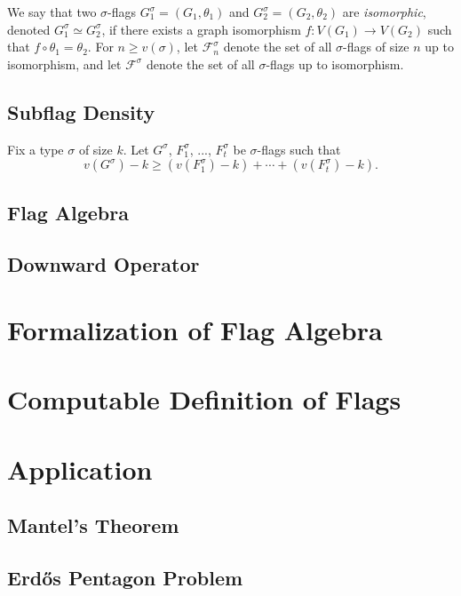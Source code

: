 \documentclass{article}
\begin{document}
We say that two $\sigma$-flags $G^{\sigma}_1=(G_1,\theta_1)$ and $G^{\sigma}_2=(G_2,\theta_2)$ are \emph{isomorphic}, denoted $G^{\sigma}_1 \simeq G^{\sigma}_2$, if there exists a graph isomorphism $f : V(G_1) \to V(G_2)$ such that $f \circ \theta_1 = \theta_2$. For $n \ge v(\sigma)$, let $\mathcal{F}_n^{\sigma}$ denote the set of all $\sigma$-flags of size $n$ up to isomorphism, and let $\mathcal{F}^{\sigma}$ denote the set of all $\sigma$-flags up to isomorphism.

\subsection{Subflag Density}

Fix a type $\sigma$ of size $k$. Let $G^{\sigma}$, $F^{\sigma}_1$, ..., $F^{\sigma}_t$ be $\sigma$-flags such that
\[
    v(G^{\sigma}) - k \ge (v(F^{\sigma}_1) - k) + \cdots + (v(F^{\sigma}_t) - k).
\]

\subsection{Flag Algebra}

\subsection{Downward Operator}

\section{Formalization of Flag Algebra}

\section{Computable Definition of Flags}

\section{Application}

\subsection{Mantel's Theorem}

\subsection{Erdős Pentagon Problem}
\end{document}
